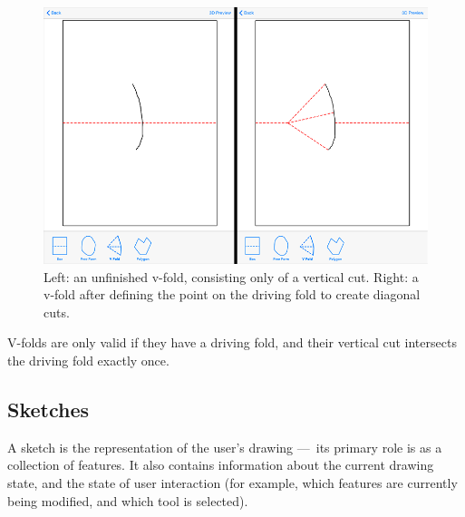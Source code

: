 \begin{figure}[htbp]
\centering
\includegraphics{figures/33_UI_Interface_Data_Structures/vfold_before_after.png}
\caption{Left: an unfinished v-fold, consisting only of a vertical cut.
Right: a v-fold after defining the point on the driving fold to create
diagonal cuts.}
\end{figure}

V-folds are only valid if they have a driving fold, and their vertical
cut intersects the driving fold exactly once.

\subsection{Sketches}\label{sketches}

A sketch is the representation of the user's drawing ---~its primary
role is as a collection of features. It also contains information about
the current drawing state, and the state of user interaction (for
example, which features are currently being modified, and which tool is
selected).
